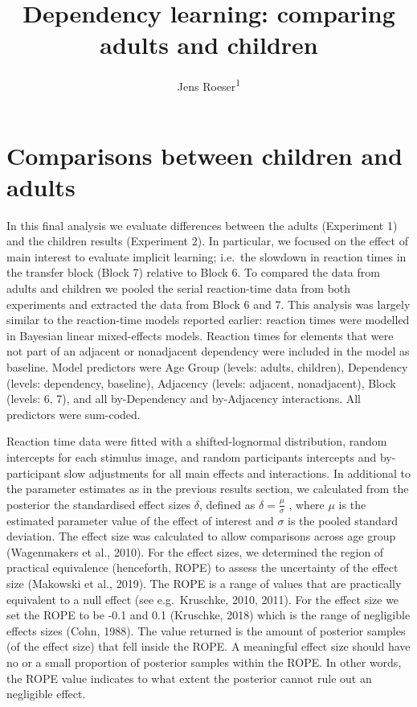 \documentclass[
  english,
  man,floatsintext]{apa7}
\author{Jens Roeser\textsuperscript{1}}
\affiliation{
\vspace{0.5cm}
\textsuperscript{1} Department of Psychology, Nottingham Trent University, United Kingdom}
\title{Dependency learning: comparing adults and children}
\date{}
\begin{document}
\maketitle

\hypertarget{comparisons-between-children-and-adults}{%
\section{Comparisons between children and adults}\label{comparisons-between-children-and-adults}}

In this final analysis we evaluate differences between the adults (Experiment 1) and the children results (Experiment 2). In particular, we focused on the effect of main interest to evaluate implicit learning; i.e.~the slowdown in reaction times in the transfer block (Block 7) relative to Block 6. To compared the data from adults and children we pooled the serial reaction-time data from both experiments and extracted the data from Block 6 and 7. This analysis was largely similar to the reaction-time models reported earlier: reaction times were modelled in Bayesian linear mixed-effects models. Reaction times for elements that were not part of an adjacent or nonadjacent dependency were included in the model as baseline. Model predictors were Age Group (levels: adults, children), Dependency (levels: dependency, baseline), Adjacency (levels: adjacent, nonadjacent), Block (levels: 6, 7), and all by-Dependency and by-Adjacency interactions. All predictors were sum-coded.

Reaction time data were ﬁtted with a shifted-lognormal distribution, random intercepts for each stimulus image, and random participants intercepts and by-participant slow adjustments for all main effects and interactions. In additional to the parameter estimates as in the previous results section, we calculated from the posterior the standardised effect sizes \(\delta\), defined as \(\delta = \frac{\mu}{\sigma}\) , where \(\mu\) is the estimated parameter value of the effect of interest and \(\sigma\) is the pooled standard deviation. The effect size was calculated to allow comparisons across age group (Wagenmakers et al., 2010). For the effect sizes, we determined the region of practical equivalence (henceforth, ROPE) to assess the uncertainty of the effect size (Makowski et al., 2019). The ROPE is a range of values that are practically equivalent to a null effect (see e.g.~Kruschke, 2010, 2011). For the effect size we set the ROPE to be -0.1 and 0.1 (Kruschke, 2018) which is the range of negligible effects sizes (Cohn, 1988). The value returned is the amount of posterior samples (of the effect size) that fell inside the ROPE. A meaningful effect size should have no or a small proportion of posterior samples within the ROPE. In other words, the ROPE value indicates to what extent the posterior cannot rule out an negligible effect.
\end{document}
